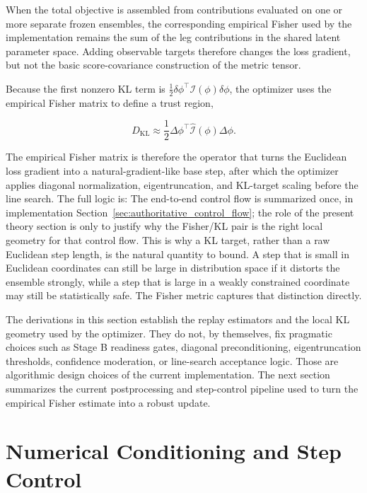 When the total objective is assembled from contributions evaluated on one or more separate frozen ensembles, the corresponding empirical Fisher used by the implementation remains the sum of the leg contributions in the shared latent parameter space. Adding observable targets therefore changes the loss gradient, but not the basic score-covariance construction of the metric tensor.

Because the first nonzero KL term is $\frac{1}{2} \delta \phi^\top \mathcal{I}(\phi) \delta \phi$, the optimizer uses the empirical Fisher matrix to define a trust region,

\begin{equation}
    D_{\mathrm{KL}}
    \approx
    \frac{1}{2}
    \Delta \phi^\top
    \widehat{\mathcal{I}}(\phi)
    \Delta \phi.
    \label{eq:kltrust}
\end{equation}

The empirical Fisher matrix is therefore the operator that turns the Euclidean loss gradient into a natural-gradient-like base step, after which the optimizer applies diagonal normalization, eigentruncation, and KL-target scaling before the line search. The full logic is:
The end-to-end control flow is summarized once, in implementation Section~\ref{sec:authoritative_control_flow}; the role of the present theory section is only to justify why the Fisher/KL pair is the right local geometry for that control flow. This is why a KL target, rather than a raw Euclidean step length, is the natural quantity to bound. A step that is small in Euclidean coordinates can still be large in distribution space if it distorts the ensemble strongly, while a step that is large in a weakly constrained coordinate may still be statistically safe. The Fisher metric captures that distinction directly.

The derivations in this section establish the replay estimators and the local KL geometry used by the optimizer. They do not, by themselves, fix pragmatic choices such as Stage B readiness gates, diagonal preconditioning, eigentruncation thresholds, confidence moderation, or line-search acceptance logic. Those are algorithmic design choices of the current implementation. The next section summarizes the current postprocessing and step-control pipeline used to turn the empirical Fisher estimate into a robust update.


\section{Numerical Conditioning and Step Control}

